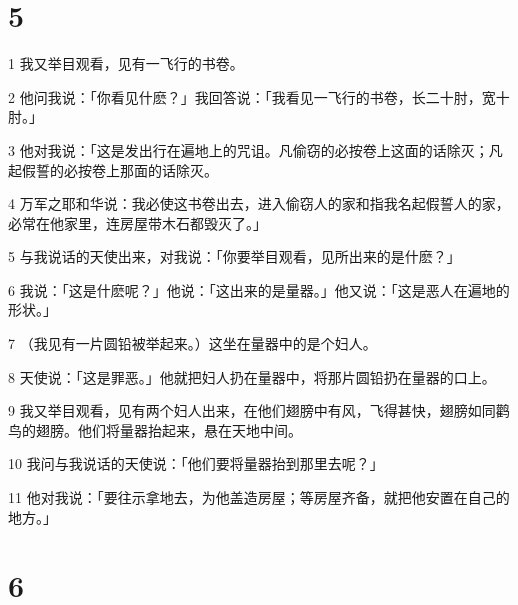 \chapter{5}

\par 1 我又举目观看，见有一飞行的书卷。
\par 2 他问我说：「你看见什麽？」我回答说：「我看见一飞行的书卷，长二十肘，宽十肘。」
\par 3 他对我说：「这是发出行在遍地上的咒诅。凡偷窃的必按卷上这面的话除灭；凡起假誓的必按卷上那面的话除灭。
\par 4 万军之耶和华说：我必使这书卷出去，进入偷窃人的家和指我名起假誓人的家，必常在他家里，连房屋带木石都毁灭了。」
\par 5 与我说话的天使出来，对我说：「你要举目观看，见所出来的是什麽？」
\par 6 我说：「这是什麽呢？」他说：「这出来的是量器。」他又说：「这是恶人在遍地的形状。」
\par 7 （我见有一片圆铅被举起来。）这坐在量器中的是个妇人。
\par 8 天使说：「这是罪恶。」他就把妇人扔在量器中，将那片圆铅扔在量器的口上。
\par 9 我又举目观看，见有两个妇人出来，在他们翅膀中有风，飞得甚快，翅膀如同鹳鸟的翅膀。他们将量器抬起来，悬在天地中间。
\par 10 我问与我说话的天使说：「他们要将量器抬到那里去呢？」
\par 11 他对我说：「要往示拿地去，为他盖造房屋；等房屋齐备，就把他安置在自己的地方。」

\chapter{6}

